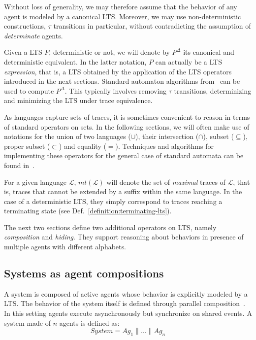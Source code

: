 Without loss of generality, we may therefore assume that the behavior of any agent is modeled by a canonical LTS. Moreover, we may use non-deterministic constructions, $\tau$ transitions in particular, without contradicting the assumption of \emph{determinate} agents. 

Given a LTS $P$, deterministic or not, we will denote by $P^{\Delta}$ its canonical and deterministic equivalent. In the latter notation, $P$ can actually be a LTS \emph{expression}, that is, a LTS obtained by the application of the LTS operators introduced in the next sections. Standard automaton algorithms from~\cite{Hopcroft:1979} can be used to compute $P^\Delta$. This typically involves removing $\tau$ transitions, determinizing and minimizing the LTS under trace equivalence.

As languages capture sets of traces, it is sometimes convenient to reason in terms of standard operators on sets. In the following sections, we will often make use of notations for the union of two languages ($\cup$), their intersection ($\cap$), subset ($\subseteq$), proper subset ($\subset$) and equality ($=$). Techniques and algorithms for implementing these operators for the general case of standard automata can be found in~\cite{Hopcroft:1979, Aho:1986}. 

For a given language $\mathcal{L}$, $mt(\mathcal{L})$ will denote the set of \emph{maximal} traces of $\mathcal{L}$, that is, traces that cannot be extended by a suffix within the same language. In the case of a deterministic LTS, they simply correspond to traces reaching a terminating state (see Def.~\ref{definition:terminating-lts}).

The next two sections define two additional operators on LTS, namely \emph{composition} and \emph{hiding}. They support reasoning about behaviors in presence of multiple agents with different alphabets.

\subsection{Systems as agent compositions\label{subsection:lts-composition}}

A system is composed of active agents whose behavior is explicitly modeled by a LTS. The behavior of the system itself is defined through parallel composition~\cite{Hoare:1985}. In this setting agents execute asynchronously but synchronize on shared events. A system made of $n$ agents is defined as:
\begin{equation}
System = Ag_1 \parallel \ldots \parallel Ag_n
\label{equation:parallel-composition}
\end{equation}

